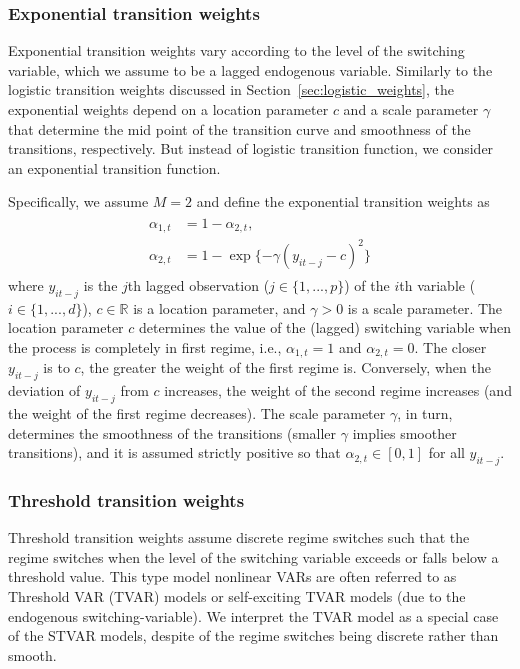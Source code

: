 \documentclass[nojss]{jss}
\begin{document}
\subsubsection{Exponential transition weights}

Exponential transition weights \citep[see, e.g.,][]{Terasvirta:1994} vary according to the level of the switching variable, which we assume to be a lagged endogenous variable. Similarly to the logistic transition weights discussed in Section~\ref{sec:logistic_weights}, the exponential weights depend on a location parameter $c$ and a scale parameter $\gamma$ that determine the mid point of the transition curve and smoothness of the transitions, respectively. But instead of logistic transition function, we consider an exponential transition function.

Specifically, we assume $M=2$ and define the exponential transition weights as
\begin{align}
\begin{aligned}
\alpha_{1,t} &= 1 - \alpha_{2,t},\\
\alpha_{2,t} &= 1 - \exp\lbrace -\gamma(y_{it-j} - c)^2\rbrace
\end{aligned}
\end{align}
where $y_{it-j}$ is the $j$th lagged observation ($j\in \lbrace 1,...,p \rbrace$) of the $i$th variable ($i\in \lbrace 1,...,d \rbrace$), $c\in\mathbb{R}$ is a location parameter, and $\gamma > 0$ is a scale parameter. The location parameter $c$ determines the value of the (lagged) switching variable when the process is completely in first regime, i.e., $\alpha_{1,t}=1$ and $\alpha_{2,t}=0$. The closer $y_{it-j}$ is to $c$, the greater the weight of the first regime is. Conversely, when the deviation of $y_{it-j}$ from $c$ increases, the weight of the second regime increases (and the weight of the first regime decreases). The scale parameter $\gamma$, in turn, determines the smoothness of the transitions (smaller $\gamma$ implies smoother transitions), and it is assumed strictly positive so that $\alpha_{2,t}\in[0,1]$ for all $y_{it-j}$.

\subsubsection{Threshold transition weights}\label{sec:threshold_weights}

Threshold transition weights assume discrete regime switches such that the regime switches when the level of the switching variable exceeds or falls below a threshold value. This type model nonlinear VARs are often referred to as Threshold VAR (TVAR) models \citep{Tsay:1998} or self-exciting TVAR models (due to the endogenous switching-variable). We interpret the TVAR model as a special case of the STVAR models, despite of the regime switches being discrete rather than smooth.
\end{document}
